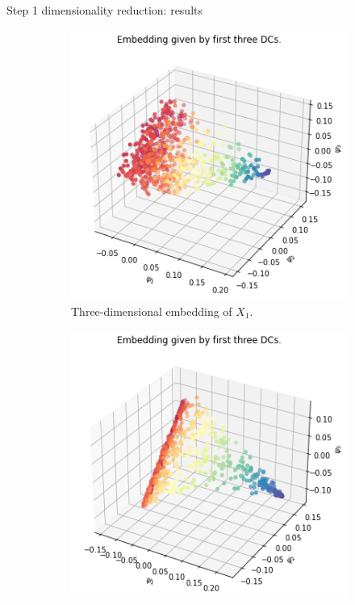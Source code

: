 \documentclass[xcolor={dvipsnames,svgnames}]{beamer}
\begin{document}
    \begin{frame}{Step 1 dimensionality reduction: results}
\begin{figure}[H]
\centering
\begin{subfigure}[b]{0.3\textwidth}
    \includegraphics[width=\textwidth]{figures/X1_embedding.png}
    \caption{Three-dimensional embedding of $X_1$.}
\end{subfigure}
\hfill
\begin{subfigure}[b]{0.3\textwidth}
    \includegraphics[width=\textwidth]{figures/X2_embedding.png}

\end{subfigure}
\end{figure}
\end{frame}
\end{document}
